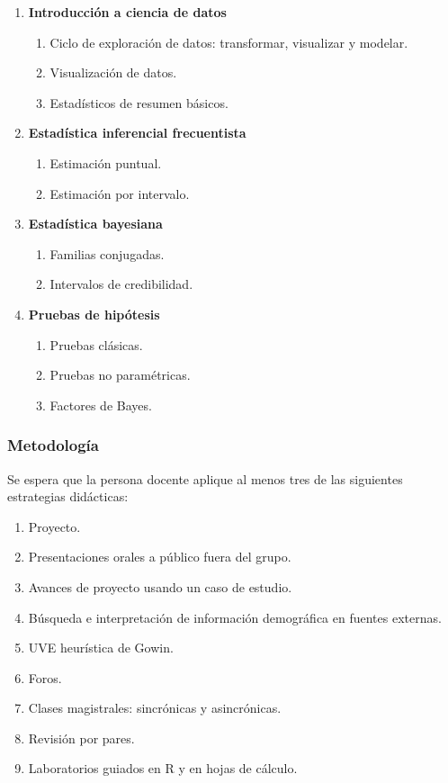 \begin{refsection}
\begin{enumerate}
\item \textbf{Introducción a ciencia de datos}
\begin{enumerate}
\item Ciclo de exploración de datos: transformar, visualizar y modelar.
\item Visualización de datos.
\item Estadísticos de resumen básicos.
\end{enumerate}
\item \textbf{Estadística inferencial frecuentista}
\begin{enumerate}
\item Estimación puntual.
\item Estimación por intervalo.
\end{enumerate}
\item \textbf{Estadística bayesiana}
\begin{enumerate}
\item Familias conjugadas.
\item Intervalos de credibilidad.
\end{enumerate}
\item \textbf{Pruebas de hipótesis}
\begin{enumerate}
\item Pruebas clásicas.
\item Pruebas no paramétricas.
\item Factores de Bayes.
\end{enumerate}
\end{enumerate}

\subsubsection*{Metodología}

Se espera que la persona docente aplique al menos tres de las siguientes estrategias didácticas:

\begin{enumerate}
\item Proyecto.
\item Presentaciones orales a público fuera del grupo.
\item Avances de proyecto usando un caso de estudio.
\item Búsqueda e interpretación de información demográfica en fuentes externas.
\item UVE heurística de Gowin.
\item Foros.
\item Clases magistrales: sincrónicas y asincrónicas.
\item Revisión por pares.
\item Laboratorios guiados en R y en hojas de cálculo.
\end{enumerate}


\end{refsection}
